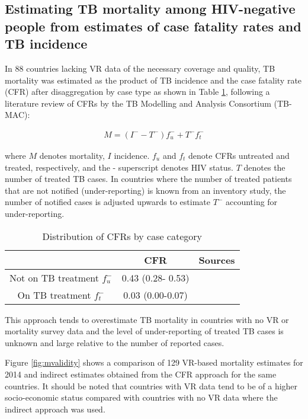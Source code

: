 \subsection{Estimating TB mortality among HIV-negative people from estimates of case fatality rates and TB incidence
}

In 88 countries lacking VR data of the necessary coverage and quality, TB mortality was estimated as the product of TB incidence and the case fatality rate (CFR) after disaggregation by case type as shown in Table \ref{tab:cfr}, following a literature review of CFRs by the TB Modelling and Analysis Consortium (TB-MAC):

\begin{align*}
M = (I^{-} -T^{-})f^{-}_u + T^{-}f^{-}_t 
\end{align*}

where $M$ denotes mortality, $I$ incidence. $f_u$ and $f_t$ denote CFRs untreated and treated, respectively, and the - superscript denotes HIV status. $T$ denotes the number of treated TB cases. In countries where the number of treated patients that are not notified (under-reporting) is known from an inventory study, the number of notified cases is adjusted upwards to estimate $T^{-}$ accounting for under-reporting. 

\begin{table} 
    \begin{tabular}{ c c c }
    \hline
         & CFR & Sources \\ 
         \hline
        Not on TB treatment $f^-_u$ & 0.43 (0.28- 0.53) &  \cite{12742798} \cite{21483732} \\ 
        On TB treatment $f^-_t$ & 0.03 (0.00-0.07) &  \cite{21738585} \\ 
        \hline
    \end{tabular} 
    \caption{Distribution of CFRs by case category} 
    \label{tab:cfr}
\end{table}

This approach tends to overestimate TB mortality in countries with no VR or mortality survey data and the level of under-reporting of treated TB cases is unknown and large relative to the number of reported cases. 

Figure \ref{fig:mvalidity} shows a comparison of 129 VR-based mortality estimates for 2014 and indirect estimates obtained from the CFR approach for the same countries. It should be noted that countries with VR data tend to be of a higher socio-economic status compared with countries with no VR data where the indirect approach was used.


